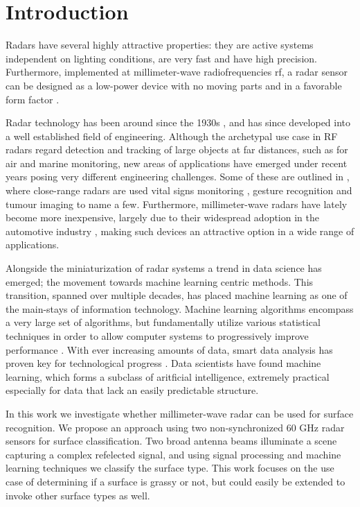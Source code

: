 \chapter{Introduction}


Radars have several highly attractive properties: they are active systems independent on lighting conditions, are very fast and have high precision. Furthermore, implemented at millimeter-wave radiofrequencies \gls{rf}, a radar sensor can be designed as a low-power device with no moving parts and in a favorable form factor \citep{lien_gillian_karagozler_amihood_schwesig_olson_raja_poupyrev_2016}.

Radar technology has been around since the 1930s \citep{watson-watt_1945}, and has since developed into a well established field of engineering. Although the archetypal use case in RF radars regard detection and tracking of large objects at far distances, such as for air and marine monitoring, new areas of applications have emerged under recent years posing very different engineering challenges. Some of these are outlined in \citep{amin_2017}, where close-range radars are used vital signs monitoring \citep{kuo_lin_yu_lo_lyu_chou_chuang_2016}, gesture recognition \citep{lien_gillian_karagozler_amihood_schwesig_olson_raja_poupyrev_2016} and tumour imaging \citep{klemm_gibbins_leendertz_horseman_preece_benjamin_craddock_2011} to name a few. Furthermore, millimeter-wave radars have lately become more inexpensive, largely due to their widespread adoption in the automotive industry \citep{frenzel_2018}, making such devices an attractive option in a wide range of applications.

Alongside the miniaturization of radar systems a trend in data science has emerged; the movement towards machine learning centric methods. This transition, spanned over multiple decades, has placed machine learning as one of the main-stays of information technology. Machine learning algorithms encompass a very large set of algorithms, but fundamentally utilize various statistical techniques in order to allow computer systems to progressively improve performance \citep{a_smola_svn_vishwanathan_2010}. With ever increasing amounts of data, smart data analysis has proven key for technological progress . Data scientists have found machine learning, which forms a subclass of aritficial intelligence, extremely practical especially for data that lack an easily predictable structure.

In this work we investigate whether millimeter-wave radar can be used for surface recognition. We propose an approach using two non-synchronized 60 GHz radar sensors for surface classification. Two broad antenna beams illuminate a scene capturing a complex refelected signal, and using signal processing and machine learning techniques we classify the surface type. This work focuses on the use case of determining if a surface is grassy or not, but could easily be extended to invoke other surface types as well.  

